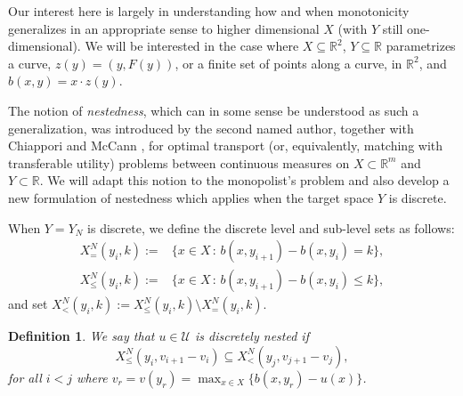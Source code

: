 \documentclass[12pt,reqno]{amsart}
\newtheorem{definition}{Definition}
\begin{document}
Our interest here is largely in understanding how and when monotonicity generalizes in an appropriate sense to higher dimensional $X$ (with $Y$ still one-dimensional).   We will be interested in the case where $X\subseteq \mathbb{R}^2$, $Y \subseteq \mathbb{R}$ parametrizes a curve, $z(y)=(y,F(y))$, or a finite set of points along a curve, in $\mathbb{R}^2$, and $b(x,y)=x\cdot z(y).$


The notion of \emph{nestedness}, which can in some sense be understood as such a generalization, was introduced by the second named author, together with Chiappori and McCann \cite{ChiapporiMcCannPass17}, for optimal transport (or, equivalently, matching with transferable utility) problems between continuous measures on $X \subset \mathbb{R}^m$ and $Y \subset \mathbb{R}$.  %
We will adapt this notion to the monopolist's problem and also develop a new formulation of nestedness which applies when the target space $Y$ is discrete.



When $Y=Y_N$ is discrete, we define the discrete level and sub-level sets as follows:
\begin{eqnarray}\label{eqn: discrete level sets} X_{=}^N(y_i,k):=&\{x\in X\,:\, b(x,y_{i+1})-b(x,y_{i})=k\},\\
X_{\le}^N(y_i,k):=&\{x\in X\,:\, b(x,y_{i+1})-b(x,y_{i})\le k\},\nonumber
\end{eqnarray}
and set $X_{<}^N(y_i,k):=X_{\le}^N(y_i,k)\setminus X_{=}^N(y_i,k).$ 
\begin{definition}
    We say that $u\in\mathcal{U}$ is  discretely nested  if 
    \[ X_{\le}^N(y_{i},v_{i+1}-v_i)\subseteq X_{<}^N(y_{j},v_{j+1}-v_j),\] 
     for all $i<j$   where $v_r=v(y_r)=\max_{x\in X}\{b(x,y_r)-u(x)\}$.
\end{definition}
\end{document}
